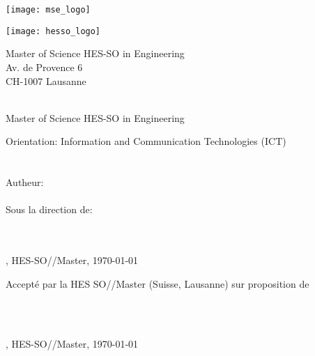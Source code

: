
\begin{titlepage}
	\begin{flushright}
		\begin{minipage}{0.5\textwidth}
			\begin{flushleft}
				\texttt{[image: mse\_logo]}
			\end{flushleft}
		\end{minipage}%
		\begin{minipage}{0.5\textwidth}
			\begin{flushright}
				\texttt{[image: hesso\_logo]}
			\end{flushright}
		\end{minipage}
		\begin{flushleft}
			\footnotesize
			Master of Science HES-SO in Engineering \\
			Av. de Provence 6 \\
			CH-1007 Lausanne
		\end{flushleft}
		~\\[0.5cm]
		
		{
		\Huge Master of Science HES-SO in Engineering\\[0.5cm]
		}
		
		{
		\LARGE Orientation: Information and Communication Technologies (ICT)\\[0.5cm]
		~\\[1cm]
		}
		{
			\Huge
			\ThesisTitle \\[1.5cm]
		}
		{
			\large
			Autheur:\\[-0.3cm]
			\Huge \Author \\[0.8cm]
		}
		{
			\large
			Sous la direction de: \\
			\Director \\
			\DirectorResearchUnit \\[0.5cm]
		}
		\vfill
		
		{\large \Place, HES-SO//Master, \today}
		
	\end{flushright}
\end{titlepage}

\newpage

\vspace{10cm}

Accepté par la HES SO//Master (Suisse, Lausanne) sur proposition de

{
	\large
	\Director \\
	\DirectorResearchUnit \\[0.5cm]
}

\vfill

\begin{flushright}
{\large \Place, HES-SO//Master, \today}
\end{flushright}

\newpage
